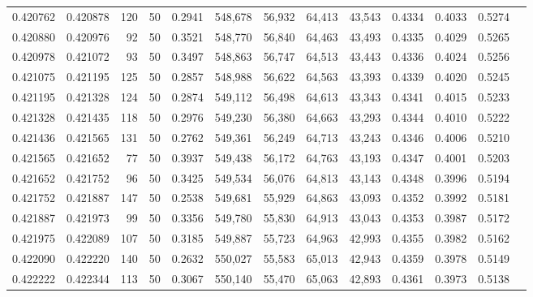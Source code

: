 \begin{tabular}{rrrrrrrrrrrrr}
0.420762 & 0.420878 &   120 &  50 &                                     0.2941 & 548,678 &  56,932 &  64,413 &  43,543 & 0.4334 & 0.4033 & 0.5274 \\
0.420880 & 0.420976 &    92 &  50 &                                     0.3521 & 548,770 &  56,840 &  64,463 &  43,493 & 0.4335 & 0.4029 & 0.5265 \\
0.420978 & 0.421072 &    93 &  50 &                                     0.3497 & 548,863 &  56,747 &  64,513 &  43,443 & 0.4336 & 0.4024 & 0.5256 \\
0.421075 & 0.421195 &   125 &  50 &                                     0.2857 & 548,988 &  56,622 &  64,563 &  43,393 & 0.4339 & 0.4020 & 0.5245 \\
0.421195 & 0.421328 &   124 &  50 &                                     0.2874 & 549,112 &  56,498 &  64,613 &  43,343 & 0.4341 & 0.4015 & 0.5233 \\
0.421328 & 0.421435 &   118 &  50 &                                     0.2976 & 549,230 &  56,380 &  64,663 &  43,293 & 0.4344 & 0.4010 & 0.5222 \\
0.421436 & 0.421565 &   131 &  50 &                                     0.2762 & 549,361 &  56,249 &  64,713 &  43,243 & 0.4346 & 0.4006 & 0.5210 \\
0.421565 & 0.421652 &    77 &  50 &                                     0.3937 & 549,438 &  56,172 &  64,763 &  43,193 & 0.4347 & 0.4001 & 0.5203 \\
0.421652 & 0.421752 &    96 &  50 &                                     0.3425 & 549,534 &  56,076 &  64,813 &  43,143 & 0.4348 & 0.3996 & 0.5194 \\
0.421752 & 0.421887 &   147 &  50 &                                     0.2538 & 549,681 &  55,929 &  64,863 &  43,093 & 0.4352 & 0.3992 & 0.5181 \\
0.421887 & 0.421973 &    99 &  50 &                                     0.3356 & 549,780 &  55,830 &  64,913 &  43,043 & 0.4353 & 0.3987 & 0.5172 \\
0.421975 & 0.422089 &   107 &  50 &                                     0.3185 & 549,887 &  55,723 &  64,963 &  42,993 & 0.4355 & 0.3982 & 0.5162 \\
0.422090 & 0.422220 &   140 &  50 &                                     0.2632 & 550,027 &  55,583 &  65,013 &  42,943 & 0.4359 & 0.3978 & 0.5149 \\
0.422222 & 0.422344 &   113 &  50 &                                     0.3067 & 550,140 &  55,470 &  65,063 &  42,893 & 0.4361 & 0.3973 & 0.5138 \\

\end{tabular}
